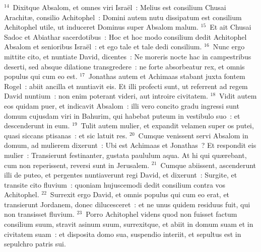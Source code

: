 ${}^{14}$~Dixitque Absalom, et omnes viri Isra\"el~: Melius est consilium Chusai Arachit\ae , consilio Achitophel~: Domini autem nutu dissipatum est consilium Achitophel utile, ut induceret Dominus super Absalom malum.
${}^{15}$~Et ait Chusai Sadoc et Abiathar sacerdotibus~: Hoc et hoc modo consilium dedit Achitophel Absalom et senioribus Isra\"el~: et ego tale et tale dedi consilium.
${}^{16}$~Nunc ergo mittite cito, et nuntiate David, dicentes~: Ne moreris nocte hac in campestribus deserti, sed absque dilatione transgredere~: ne forte absorbeatur rex, et omnis populus qui cum eo est.
${}^{17}$~Jonathas autem et Achimaas stabant juxta fontem Rogel~: abiit ancilla et nuntiavit eis. Et illi profecti sunt, ut referrent ad regem David nuntium~: non enim poterant videri, aut introire civitatem.
${}^{18}$~Vidit autem eos quidam puer, et indicavit Absalom~: illi vero concito gradu ingressi sunt domum cujusdam viri in Bahurim, qui habebat puteum in vestibulo suo~: et descenderunt in eum.
${}^{19}$~Tulit autem mulier, et expandit velamen super os putei, quasi siccans ptisanas~: et sic latuit res.
${}^{20}$~Cumque venissent servi Absalom in domum, ad mulierem dixerunt~: Ubi est Achimaas et Jonathas~? Et respondit eis mulier~: Transierunt festinanter, gustata paululum aqua. At hi qui qu\ae rebant, cum non reperissent, reversi sunt in Jerusalem.
${}^{21}$~Cumque abiissent, ascenderunt illi de puteo, et pergentes nuntiaverunt regi David, et dixerunt~: Surgite, et transite cito fluvium~: quoniam hujuscemodi dedit consilium contra vos Achitophel.
${}^{22}$~Surrexit ergo David, et omnis populus qui cum eo erat, et transierunt Jordanem, donec dilucesceret~: et ne unus quidem residuus fuit, qui non transisset fluvium.
${}^{23}$~Porro Achitophel videns quod non fuisset factum consilium suum, stravit asinum suum, surrexitque, et abiit in domum suam et in civitatem suam~: et disposita domo sua, suspendio interiit, et sepultus est in sepulchro patris sui.


